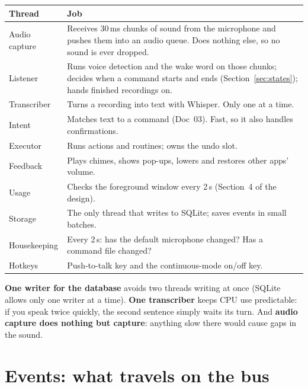 \documentclass[11pt,a4paper]{article}
\begin{document}
\begin{center}
\renewcommand{\arraystretch}{1.2}
\begin{tabularx}{\textwidth}{l X}
\toprule
\textbf{Thread} & \textbf{Job} \\
\midrule
Audio capture   & Receives 30\,ms chunks of sound from the microphone and pushes them into an audio queue. Does nothing else, so no sound is ever dropped. \\
Listener        & Runs voice detection and the wake word on those chunks; decides when a command starts and ends (Section~\ref{sec:states}); hands finished recordings on. \\
Transcriber     & Turns a recording into text with Whisper. Only one at a time. \\
Intent          & Matches text to a command (Doc~03). Fast, so it also handles confirmations. \\
Executor        & Runs actions and routines; owns the undo slot. \\
Feedback        & Plays chimes, shows pop-ups, lowers and restores other apps' volume. \\
Usage           & Checks the foreground window every 2\,s (Section~4 of the design). \\
Storage         & The only thread that writes to SQLite; saves events in small batches. \\
Housekeeping    & Every 2\,s: has the default microphone changed? Has a command file changed? \\
Hotkeys         & Push-to-talk key and the continuous-mode on/off key. \\
\bottomrule
\end{tabularx}
\end{center}

\begin{why}
\textbf{One writer for the database} avoids two threads writing at once (SQLite allows only one
writer at a time). \textbf{One transcriber} keeps CPU use predictable: if you speak twice
quickly, the second sentence simply waits its turn. And \textbf{audio capture does nothing but
capture}: anything slow there would cause gaps in the sound.
\end{why}

\section{Events: what travels on the bus}
\end{document}
